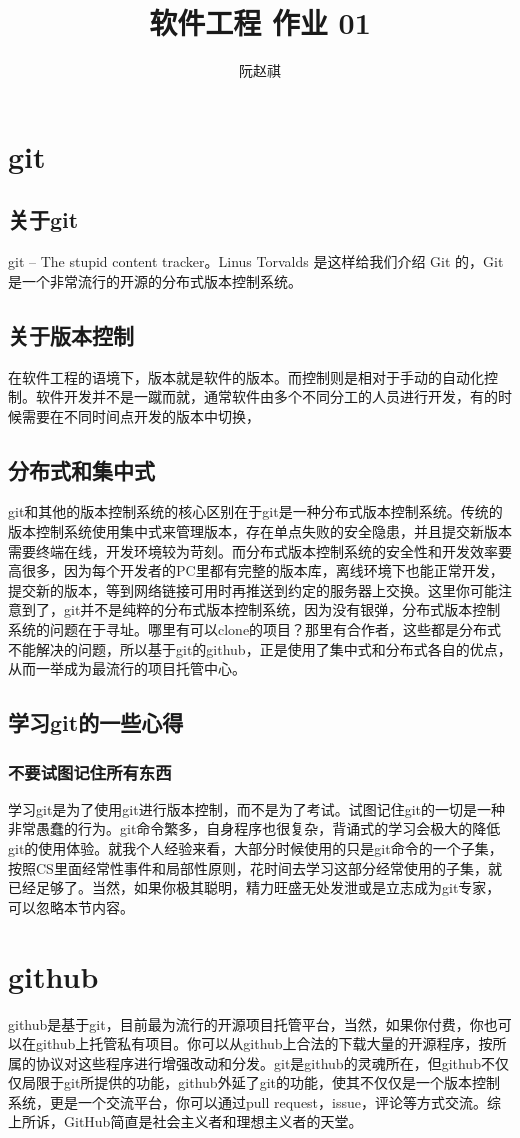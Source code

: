 \documentclass{article}
\title{软件工程 作业 01}
\author{阮赵祺}
\begin{document}
	
	\maketitle
	\section{git}
	\subsection{关于git}
	git --	The stupid content tracker。Linus Torvalds 是这样给我们介绍 Git 的，Git是一个非常流行的开源的分布式版本控制系统。
	\subsection{关于版本控制}
	在软件工程的语境下，版本就是软件的版本。而控制则是相对于手动的自动化控制。软件开发并不是一蹴而就，通常软件由多个不同分工的人员进行开发，有的时候需要在不同时间点开发的版本中切换，
	\subsection{分布式和集中式}
	git和其他的版本控制系统的核心区别在于git是一种分布式版本控制系统。传统的版本控制系统使用集中式来管理版本，存在单点失败的安全隐患，并且提交新版本需要终端在线，开发环境较为苛刻。而分布式版本控制系统的安全性和开发效率要高很多，因为每个开发者的PC里都有完整的版本库，离线环境下也能正常开发，提交新的版本，等到网络链接可用时再推送到约定的服务器上交换。这里你可能注意到了，git并不是纯粹的分布式版本控制系统，因为没有银弹，分布式版本控制系统的问题在于寻址。哪里有可以clone的项目？那里有合作者，这些都是分布式不能解决的问题，所以基于git的github，正是使用了集中式和分布式各自的优点，从而一举成为最流行的项目托管中心。
	\subsection{学习git的一些心得}
	\subsubsection{不要试图记住所有东西}
	学习git是为了使用git进行版本控制，而不是为了考试。试图记住git的一切是一种非常愚蠢的行为。git命令繁多，自身程序也很复杂，背诵式的学习会极大的降低git的使用体验。就我个人经验来看，大部分时候使用的只是git命令的一个子集，按照CS里面经常性事件和局部性原则，花时间去学习这部分经常使用的子集，就已经足够了。当然，如果你极其聪明，精力旺盛无处发泄或是立志成为git专家，可以忽略本节内容。
	\section{github}
	github是基于git，目前最为流行的开源项目托管平台，当然，如果你付费，你也可以在github上托管私有项目。你可以从github上合法的下载大量的开源程序，按所属的协议对这些程序进行增强改动和分发。git是github的灵魂所在，但github不仅仅局限于git所提供的功能，github外延了git的功能，使其不仅仅是一个版本控制系统，更是一个交流平台，你可以通过pull request，issue，评论等方式交流。综上所诉，GitHub简直是社会主义者和理想主义者的天堂。
\end{document}
